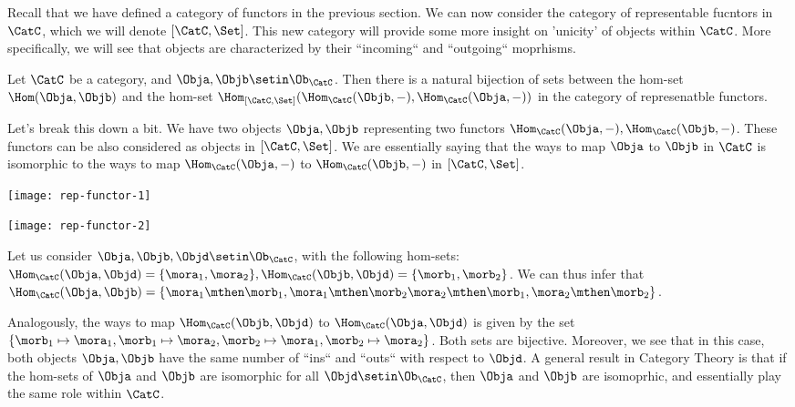 Recall that we have defined a category of functors in the previous section.
We can now consider the category of representable fucntors in $\CatC$, which we will denote $[\CatC, \Set]$.
This new category will provide some more insight on 'unicity' of objects within $\CatC$.
More specifically, we will see that objects are characterized by their ``incoming`` and ``outgoing`` moprhisms.

\begin{theorem}
    Let $\CatC$ be a category, and $\Obja, \Objb \setin \Ob_\CatC$.
    Then there is a natural bijection of sets between the hom-set $\Hom(\Obja,\Objb)$ and the hom-set  $\Hom_{[\CatC, \Set]}(\Hom_\CatC(\Objb, -), \Hom_\CatC(\Obja, -))$ in the category of represenatble functors.
\end{theorem}
Let's break this down a bit.
We have two objects $\Obja, \Objb$ representing two functors $\Hom_\CatC(\Obja,-), \Hom_\CatC(\Objb,-)$.
These functors can be also considered as objects in $[\CatC, \Set]$.
We are essentially saying that the ways to map $\Obja$ to $\Objb$ in $\CatC$ is isomorphic to the ways to map $\Hom_\CatC(\Obja,-)$ to $ \Hom_\CatC(\Objb,-)$ in $[\CatC, \Set]$.

\begin{example}
    \begin{marginfigure}
        \centering
        \texttt{[image: rep-functor-1]}
        \label{fig:rep-functor-1}
    \end{marginfigure}

    \begin{marginfigure}
        \centering
        \texttt{[image: rep-functor-2]}
        \label{fig:rep-functor-2}
    \end{marginfigure}
    Let us consider $\Obja, \Objb, \Objd \setin \Ob_\CatC$, with the following hom-sets: $\Hom_\CatC(\Obja, \Objd) = \{\mora_1,\mora_2\}, \Hom_\CatC(\Objb, \Objd) = \{\morb_1,\morb_2\}$.
    We can thus infer that $\Hom_\CatC(\Obja, \Objb) = \{\mora_1\mthen\morb_1, \mora_1\mthen\morb_2 \mora_2\mthen\morb_1, \mora_2\mthen\morb_2 \}$.

    Analogously, the ways to map $\Hom_\CatC(\Objb, \Objd)$ to $\Hom_\CatC(\Obja, \Objd)$ is given by the set $\{\morb_1 \mapsto \mora_1, \morb_1 \mapsto \mora_2, \morb_2 \mapsto \mora_1, \morb_2 \mapsto \mora_2\}$.
    Both sets are bijective.
    Moreover, we see that in this case, both objects $\Obja, \Objb$ have the same number of ``ins`` and ``outs`` with respect to $\Objd$.
    A general result in Category Theory is that if the hom-sets of $\Obja$ and $\Objb$ are isomorphic for all $\Objd \setin \Ob_\CatC$, then $\Obja$ and $\Objb$ are isomoprhic, and essentially play the same role within $\CatC$.
\end{example}

